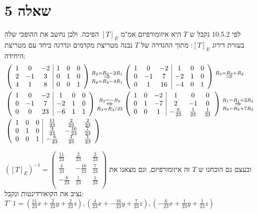 \documentclass{article}
\begin{document}
	\section*{שאלה 5}
	לפי 10.5.2 נקבל ש $T$ היא איזומורפיזם אמ"מ $[T]_E$ הפיכה. ולכן נחשב את ההופכי שלה בעזרת דירוג $[T]_E$:
	מתוך ההגדרה של $T$ נבנה מטריצת מקדמים ונדרגה ביחד עם מטריצת היחידה:
	\begin{align*}
		&\left( \begin{array}{ccc|ccc}
			1 & 0 & -2 & 1 & 0 & 0 \\
			2 & -1 & 3 & 0 & 1 & 0 \\
			4 & 1 & 8 & 0 & 0 & 1 \\
		\end{array} \right) \overset{R_2 = R_2 -2R_1}{\underset{R_4 = R_4 - 4R_1}\Rightarrow}
		\left( \begin{array}{ccc|ccc}
			1 & 0 & -2 & 1 & 0 & 0 \\
			0 & -1 & 7 & -2 & 1 & 0 \\
			0 & 1 & 16 & -4 & 0 & 1 \\
		\end{array} \right) \overset{R_3 = R_3 + R_2}{\Rightarrow} \\
		&\left( \begin{array}{ccc|ccc}
			1 & 0 & -2 & 1 & 0 & 0 \\
			0 & -1 & 7 & -2 & 1 & 0 \\
			0 & 0 & 23 & -6 & 1 & 1 \\
		\end{array} \right) \overset{R_2 = -R_2}{\underset{R_3 = R_3/23}\Rightarrow}
		\left( \begin{array}{ccc|ccc}
			1 & 0 & -2 & 1 & 0 & 0 \\
			0 & 1 & -7 & 2 & -1 & 0 \\
			0 & 0 & 1 & -\frac{6}{23} & \frac{1}{23} & \frac{1}{23} \\
		\end{array} \right) \overset{R_1 = R_1 + 2R_3}{\underset{R_2 = R_2 + 7R_3}\Rightarrow} \\
		&\left( \begin{array}{ccc|ccc}
			1 & 0 & 0 & \frac{11}{23} & \frac{2}{23} & \frac{2}{23} \\
			0 & 1 & 0 & \frac{4}{23} & -\frac{16}{23} & \frac{7}{23} \\
			0 & 0 & 1 & -\frac{6}{23} & \frac{1}{23} & \frac{1}{23} \\
		\end{array} \right)
	\end{align*}

	ובעצם גם הוכחנו ש $T$ זה איזומורפיזם, וגם מצאנו את $([T]_E)^{-1} = \begin{pmatrix}
		\frac{11}{23} & \frac{2}{23} & \frac{2}{23} \\
		\frac{4}{23} & -\frac{16}{23} & \frac{7}{23} \\
		-\frac{6}{23} & \frac{1}{23} & \frac{1}{23} \\
	\end{pmatrix}$
	נציב את הקואורדינטות ונקבל: $T^-1 = (\frac{11}{23}x +  \frac{2}{23}y + \frac{2}{23}z),
	(\frac{4}{23}x + -\frac{16}{23}y +  \frac{7}{23}z),
	(-\frac{6}{23}x + \frac{1}{23}y + \frac{1}{23}z)$
\end{document}
